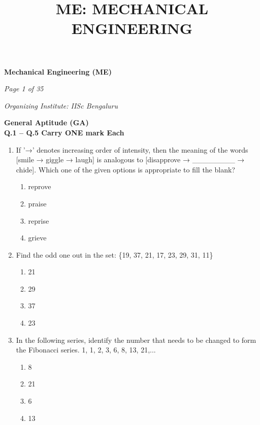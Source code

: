 \documentclass[journal,11pt,onecolumn]{IEEEtran}
\title{ME: MECHANICAL ENGINEERING}
\begin{document}
\begin{center}

    \Large

    \textbf{Mechanical Engineering (ME)}

\end{center}

\textit{Page 1 of 35}

\hfill

\textit{Organizing Institute: IISc Bengaluru}

\large\textbf{General Aptitude (GA)}\\

\large\textbf{Q.1 – Q.5 Carry ONE mark Each}\\

\begin{enumerate}

    \item If '→' denotes increasing order of intensity, then the meaning of the words [smile → giggle → laugh] is analogous to [disapprove → \_\_\_\_\_\_\_\_ → chide]. Which one of the given options is appropriate to fill the blank?

          \begin{enumerate}
              \item reprove
              \item praise
              \item reprise
              \item grieve
          \end{enumerate}

    \item Find the odd one out in the set: \{19, 37, 21, 17, 23, 29, 31, 11\}

          \begin{enumerate}
              \item 21
              \item 29
              \item 37
              \item 23
          \end{enumerate}

    \item In the following series, identify the number that needs to be changed to form the Fibonacci series.
          1, 1, 2, 3, 6, 8, 13, 21,...

          \begin{enumerate}
              \item 8
              \item 21
              \item 6
              \item 13
          \end{enumerate}


\end{enumerate}
\end{document}
